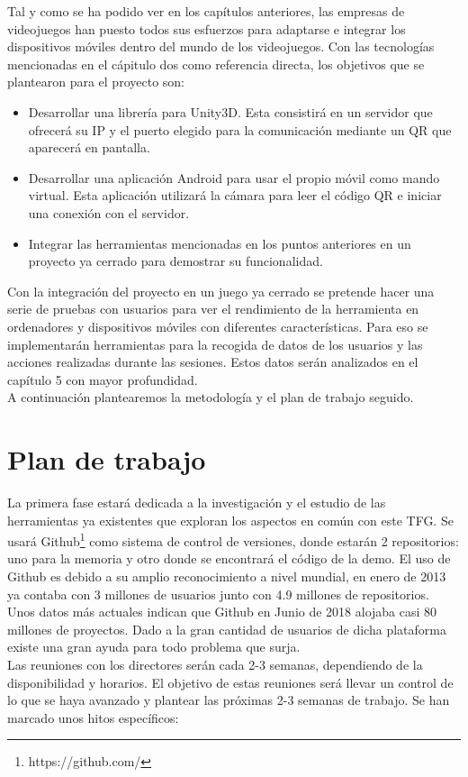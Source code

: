 Tal y como se ha podido ver en los cap\'itulos anteriores, las empresas de videojuegos han puesto todos sus esfuerzos para adaptarse e integrar los dispositivos m\'oviles dentro del mundo de los videojuegos. Con las tecnolog\'ias mencionadas en el c\'apitulo dos como referencia directa, los objetivos que se plantearon para el proyecto son:


\begin{itemize}
\item Desarrollar una librer\'ia para Unity3D. Esta consistir\'a en un servidor  que ofrecer\'a su IP y el puerto elegido para la comunicaci\'on mediante un QR que aparecer\'a en pantalla.
\item Desarrollar una aplicaci\'on Android para usar el propio m\'ovil como mando virtual. Esta aplicaci\'on utilizar\'a la c\'amara para leer el c\'odigo QR e iniciar una conexi\'on con el servidor.
\item Integrar las herramientas mencionadas en los puntos anteriores en un proyecto ya cerrado para demostrar su funcionalidad.
\end{itemize}

Con la integraci\'on del proyecto en un juego ya cerrado se pretende hacer una serie de pruebas con usuarios para ver el rendimiento de la herramienta en ordenadores y dispositivos m\'oviles con diferentes caracter\'isticas. Para eso se implementar\'an herramientas para la recogida de datos de los usuarios y las acciones realizadas durante las sesiones. Estos datos ser\'an analizados en el cap\'itulo 5 con mayor profundidad.
 \\
A continuaci\'on plantearemos la metodolog\'ia y el plan de trabajo seguido.


\section{Plan de trabajo}
\label{cap3:sec:plandetrabajo}

La primera fase estar\'a dedicada a la investigaci\'on y el estudio de las herramientas ya existentes que exploran los aspectos en com\'un con este TFG. Se usar\'a Github\footnote{https://github.com/} como sistema de control de versiones, donde estar\'an 2 repositorios: uno para la memoria y otro donde se encontrar\'a el c\'odigo de la demo. El uso de Github es debido a su amplio reconocimiento a nivel mundial, en enero de 2013 ya contaba con 3 millones de usuarios junto con 4.9 millones de repositorios. Unos datos m\'as actuales indican que Github en Junio de 2018 alojaba casi 80 millones de proyectos. Dado a la gran cantidad de usuarios de dicha plataforma existe una gran ayuda para todo problema que surja.
\\
Las reuniones con los directores ser\'an cada 2-3 semanas, dependiendo de la disponibilidad y horarios. El objetivo de estas reuniones ser\'a llevar un control de lo que se haya avanzado y plantear las pr\'oximas 2-3 semanas de trabajo.
Se han marcado unos hitos espec\'ificos:

